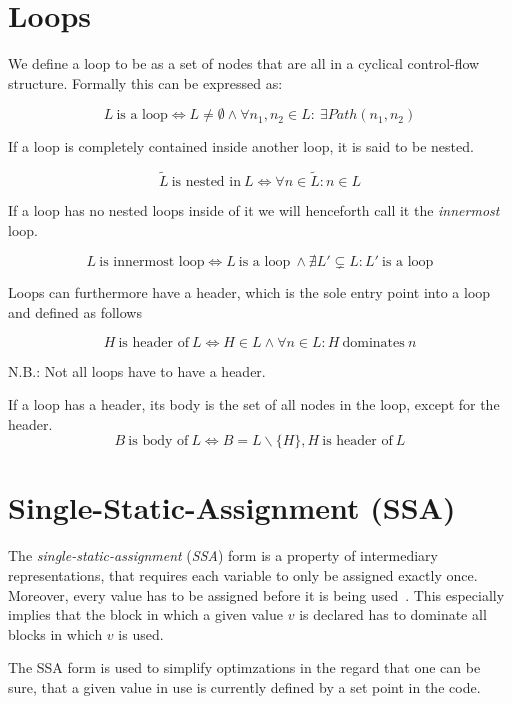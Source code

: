 
\section{Loops}\label{sec:basics:loops}

We define a loop to be as a set of nodes that are all in a cyclical control-flow structure.
Formally this can be expressed as:

$$L~\text{is a loop} \Longleftrightarrow L \neq \emptyset \wedge \forall n_1, n_2 \in L:~\exists Path(n_1, n_2)$$

If a loop is completely contained inside another loop, it is said to be nested.

$$\tilde{L}~\text{is nested in}~L \Longleftrightarrow \forall n \in \tilde{L}: n \in L$$

If a loop has no nested loops inside of it we will henceforth call it the \textit{innermost} loop.

$$L~\text{is innermost loop} \Longleftrightarrow L~\text{is a loop}~\wedge \nexists L' \subsetneq L: L'~\text{is a loop}$$

Loops can furthermore have a header, which is the sole entry point into a loop~\cite{aebi18bachelorarbeit} and defined as follows

$$H~\text{is header of}~L \Longleftrightarrow H \in L \wedge \forall n \in L: H~\text{dominates}~n$$

N.B.: Not all loops have to have a header.

If a loop has a header, its body is the set of all nodes in the loop, except for the header.
$$B~\text{is body of}~L \Longleftrightarrow B = L \backslash \{H\}, H~\text{is header of}~L$$

\section{Single-Static-Assignment (SSA)}\label{sec:basics:ssa}

The \textit{single-static-assignment} (\textit{SSA}) form is a property of intermediary representations, that requires each variable to only be assigned exactly once.
Moreover, every value has to be assigned before it is being used~\cite{cytron91}.
This especially implies that the block in which a given value $v$ is declared has to dominate all blocks in which $v$ is used.

The SSA form is used to simplify optimzations in the regard that one can be sure, that a given value in use is currently defined by a set point in the code.

